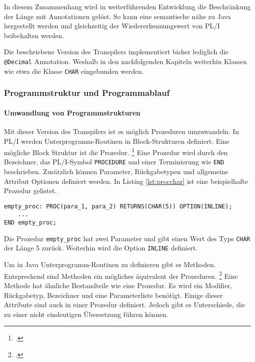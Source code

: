 In diesem Zusammenhang wird in weiterführenden Entwicklung die Beschränkung der Länge mit Annotationen gelöst. So kann eine semantische nähe zu Java hergestellt werden und gleichzeitig der Wiedererkennungswert von PL/I beibehalten werden.

Die beschriebene Version des Transpilers implementiert bisher lediglich die \verb+@Decimal+ Annotation.
Weshalb in den nachfolgenden Kapiteln weiterhin Klassen wie etwa die Klasse \verb+CHAR+ eingebunden werden.

\pagebreak
\subsubsection{Programmstruktur und Programmablauf}
\paragraph{Umwandlung von Programmstrukturen }\label{programstruct}

Mit dieser Version des Transpilers ist es möglich Prozeduren umzuwandeln.
In PL/I werden Unterprogramm-Routinen in Block-Strukturen definiert. Eine mögliche Block Struktur ist die Prozedur. \footcite[Vgl. ][S. 97ff. ]{pliref}
Eine Prozedur wird durch den Bezeichner, das PL/I-Symbol \verb+PROCEDURE+ und einer Terminierung wie \verb+END+ beschrieben.
Zusätzlich können Parameter, Rückgabetypen und allgemeine Attribut Optionen definiert werden. In Listing \ref{lst:procchar} ist eine beispielhafte Prozedur gelistet.

\begin{lstlisting}[language=PL/I, caption=Deklaration einer Prozedur des Typs Char, label={lst:procchar}]
empty_proc: PROC(para_1, para_2) RETURNS(CHAR(5)) OPTION(INLINE);
	...
END empty_proc;
\end{lstlisting}

Die Prozedur \verb+empty_proc+ hat zwei Parameter und gibt einen Wert des Typs \verb+CHAR+ der L\"ange 5 zur\"uck.
Weiterhin wird die Option \verb+INLINE+ definiert.

Um in Java Unterprogramm-Routinen zu definieren gibt es Methoden. 
Entsprechend sind Methoden ein mögliches äquivalent der Prozeduren. \footcite[Vgl. ][]{oracle}
Eine Methode hat ähnliche Bestandteile wie eine Prozedur.
Es wird ein Modifier, Rückgabetyp, Bezeichner und eine Parameterliste benötigt.
Einige dieser Attribute sind auch in einer Prozedur definiert.
Jedoch gibt es Unterschiede, die zu einer nicht eindeutigen Übersetzung führen können.

